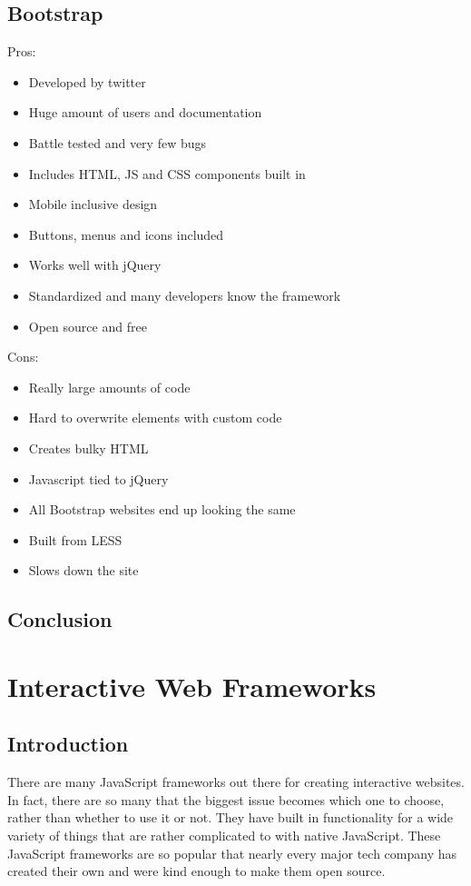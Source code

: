 \documentclass[draftclsnofoot,onecolumn,letterpaper,10pt,compsoc]{IEEEtran}
\begin{document}
	\subsection{Bootstrap}

  Pros:
  \begin{itemize}
    \item Developed by twitter
    \item Huge amount of users and documentation
    \item Battle tested and very few bugs
    \item Includes HTML, JS and CSS components built in
    \item Mobile inclusive design
    \item Buttons, menus and icons included
    \item Works well with jQuery
    \item Standardized and many developers know the framework
    \item Open source and free
  \end{itemize}

  Cons:
  \begin{itemize}
    \item Really large amounts of code
    \item Hard to overwrite elements with custom code
    \item Creates bulky HTML
    \item Javascript tied to jQuery
    \item All Bootstrap websites end up looking the same
    \item Built from LESS
    \item Slows down the site
  \end{itemize}

  \subsection{Conclusion}

\section{Interactive Web Frameworks}
  \subsection{Introduction}

  There are many JavaScript frameworks out there for creating interactive websites.
  In fact, there are so many that the biggest issue becomes which one to choose, rather than whether to use it or not.
  They have built in functionality for a wide variety of things that are rather complicated to with native JavaScript.
  These JavaScript frameworks are so popular that nearly every major tech company has created their own and were kind enough to make them open source.
\end{document}
